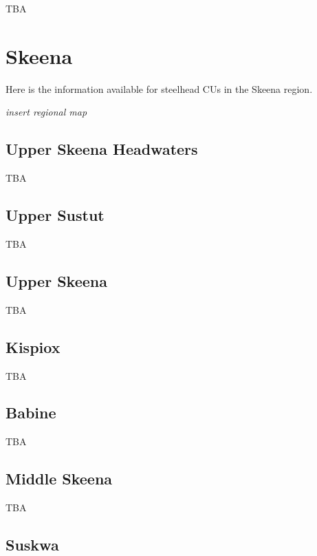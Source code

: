 \documentclass[
]{book}
\begin{document}
TBA

\hypertarget{skeena}{%
\chapter{Skeena}\label{skeena}}

Here is the information available for steelhead CUs in the Skeena region.

\emph{insert regional map}

\hypertarget{upper-skeena-headwaters}{%
\section{Upper Skeena Headwaters}\label{upper-skeena-headwaters}}

TBA

\hypertarget{upper-sustut}{%
\section{Upper Sustut}\label{upper-sustut}}

TBA

\hypertarget{upper-skeena}{%
\section{Upper Skeena}\label{upper-skeena}}

TBA

\hypertarget{kispiox}{%
\section{Kispiox}\label{kispiox}}

TBA

\hypertarget{babine}{%
\section{Babine}\label{babine}}

TBA

\hypertarget{middle-skeena}{%
\section{Middle Skeena}\label{middle-skeena}}

TBA

\hypertarget{suskwa}{%
\section{Suskwa}\label{suskwa}}
\end{document}
